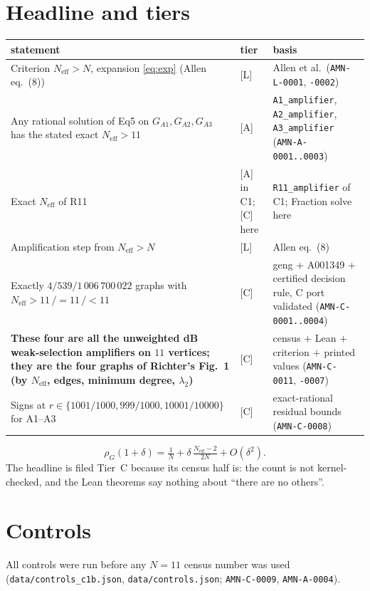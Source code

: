 \documentclass[10pt]{article}
\newcommand{\tier}[1]{\textsf{[#1]}}
\newcommand{\tA}{\tier{A}}
\newcommand{\tL}{\tier{L}}
\newcommand{\tC}{\tier{C}}
\newcommand{\lean}[1]{\texttt{#1}}
\newcommand{\Neff}{N_{\mathrm{eff}}}
\begin{document}
\section{Headline and tiers}\label{sec:head}
\begin{center}\small\begin{tabular}{p{7.2cm}p{0.9cm}p{5.1cm}}\toprule
statement & tier & basis\\\midrule
Criterion $\Neff>N$, expansion \eqref{eq:exp} (Allen eq.~(8)) & \tL & Allen et al.\ (\texttt{AMN-L-0001}, \texttt{-0002})\\
Any rational solution of Eq5 on $G_{A1},G_{A2},G_{A3}$ has the stated exact $\Neff>11$ & \tA & \lean{A1\_amplifier}, \lean{A2\_amplifier}, \lean{A3\_amplifier} (\texttt{AMN-A-0001..0003})\\
Exact $\Neff$ of R11 & \tA{} in C1; \tC{} here & \lean{R11\_amplifier} of C1; Fraction solve here\\
Amplification step from $\Neff>N$ & \tL & Allen eq.~(8)\\
Exactly $4/539/1\,006\,700\,022$ graphs with $\Neff>11\,/=11\,/<11$ & \tC & geng + A001349 + certified decision rule, C port validated (\texttt{AMN-C-0001..0004})\\
\textbf{These four are all the unweighted dB weak-selection amplifiers on $11$ vertices; they are the four graphs of Richter's Fig.~1 (by $\Neff$, edges, minimum degree, $\lambda_2$)} & \tC & census $+$ Lean $+$ criterion $+$ printed values (\texttt{AMN-C-0011}, \texttt{-0007})\\
Signs at $r\in\{1001/1000,999/1000,10001/10000\}$ for A1--A3 & \tC & exact-rational residual bounds (\texttt{AMN-C-0008})\\\bottomrule
\end{tabular}\end{center}
\begin{equation}\label{eq:exp}\rho_G(1+\delta)=\tfrac1N+\delta\,\tfrac{\Neff-2}{2N}+O(\delta^2).\end{equation}
The headline is filed Tier~C because its census half is: the count is not kernel-checked, and the Lean theorems say nothing about ``there are no others''.

\section{Controls}\label{sec:controls}
All controls were run before any $N=11$ census number was used (\texttt{data/controls\_c1b.json}, \texttt{data/controls.json}; \texttt{AMN-C-0009}, \texttt{AMN-A-0004}).
\end{document}
